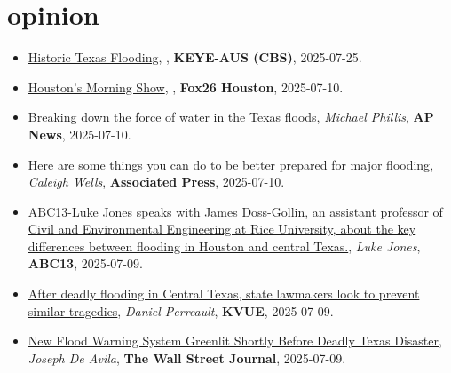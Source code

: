\documentclass[10pt,oneside]{article}
\begin{document}
\section{opinion}

\mbox{}\vspace{-\dimexpr\baselineskip\relax}

\begin{itemize}[label={}]

  \item \href{https://mms.tveyes.com/Transcript.asp?StationID=2370&DateTime=7%2F25%2F2025+6%3A31%3A37+PM&LineNumber=&MediaStationID=2370&playclip=True&RefPage=&pbc=WatchlistTerm%3A1599598}{Historic Texas Flooding}, \textit{}, \textbf{KEYE-AUS (CBS)}, 2025-07-25.

  \item \href{https://mms.tveyes.com/Transcript.asp?StationID=979&DateTime=7%2F10%2F2025+8%3A31%3A51+AM&LineNumber=&MediaStationID=979&playclip=True&RefPage=&pbc=WatchlistTerm%3A1599598}{Houston's Morning Show}, \textit{}, \textbf{Fox26 Houston}, 2025-07-10.

  \item \href{https://apnews.com/article/flash-floods-texas-hill-country-hydrology-51901309407b21b65cbbc6c04206f627}{Breaking down the force of water in the Texas floods}, \textit{Michael Phillis}, \textbf{AP News}, 2025-07-10.

  \item \href{https://apnews.com/article/flood-hurricane-emergency-disaster-prepare-abb8f9cc9ab16c89a3937638739c6663}{Here are some things you can do to be better prepared for major flooding}, \textit{Caleigh Wells}, \textbf{Associated Press}, 2025-07-10.

  \item \href{https://www.facebook.com/watch/?v=1931096184096338}{ABC13-Luke Jones speaks with James Doss-Gollin, an assistant professor of Civil and Environmental Engineering at Rice University, about the key differences between flooding in Houston and central Texas.}, \textit{Luke Jones}, \textbf{ABC13}, 2025-07-09.

  \item \href{https://www.kvue.com/article/news/politics/special-session/central-texas-flooding-special-session/269-2e5a87d4-ec92-4fb8-b850-748de1a6cbbe}{After deadly flooding in Central Texas, state lawmakers look to prevent similar tragedies}, \textit{Daniel Perreault}, \textbf{KVUE}, 2025-07-09.

  \item \href{https://www.wsj.com/us-news/climate-environment/texas-guadalupe-flood-threat-system-06c29954}{New Flood Warning System Greenlit Shortly Before Deadly Texas Disaster}, \textit{Joseph De Avila}, \textbf{The Wall Street Journal}, 2025-07-09.


\end{itemize}
\end{document}
